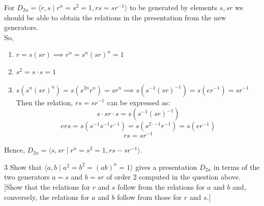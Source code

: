 \documentclass[12pt]{article}
\begin{document}
\begin{solution}
        For $D_{2n} = \langle r, s \mid r^n = s^2  = 1, rs = sr^{-1}\rangle$ to be generated by elements $s, sr$ we should be able to obtain the relations in the presentation from the new generators. \\ 
        So, 
        \begin{enumerate}
            \item $r = s(sr) \implies r^n = s^n (sr)^n = 1$
            \item $s^2 = s \cdot s = 1$ 
            \newpage
            \item $s(s^n(sr)^n)  = s(s^{2n}r^n) = sr^n\implies s(s^{-1}(sr)^{-1}) = s(er^{-1}) = sr^{-1}$ \\ 
            Then the relation, $rs = sr^{-1}$ can be expressed as: 
            \[s\cdot sr \cdot s = s(s^{-1}(sr)^{-1})\] 
            \[ers = s(s^{-1}s^{-1}r^{-1}) = s(s^{2\cdot -1}r^{-1})  = s(er^{-1})\]
            \[rs = sr^{-1}\]            
        \end{enumerate}
        Hence, $D_{2n} = \langle s, sr \mid r^n = s^2 = 1, rs - sr^{-1}\rangle.$
\end{solution}

 \newpage
\begin{problem}{3}
    Show that $\langle a, b \mid a^2 = b^2 = (ab)^n = 1 \rangle$ gives a presentation $D_{2n}$ in terms of the two generators $a = s$ and $b=sr$ of order 2 computed in the question above. [Show that the relations for $r$ and $s$ follow from the relations for $a$ and $b$ and, conversely, the relations for $a$ and $b$ follow from those for $r$ and $s$.]
\end{problem}
\end{document}
